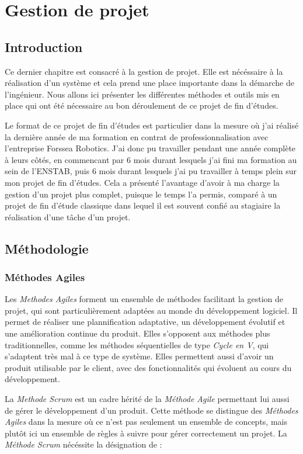 \chapter{Gestion de projet}
	
	\section{Introduction}

		Ce dernier chapitre est consacré à la gestion de projet. Elle est nécéssaire à la réalisation d'un système et cela prend une place importante dans la démarche de l'ingénieur. Nous allons ici présenter les différentes méthodes et outils mis en place qui ont été nécessaire au bon déroulement de ce projet de fin d'études.

		Le format de ce projet de fin d'études est particulier dans la mesure où j'ai réalisé la dernière année de ma formation en contrat de professionnalisation avec l'entreprise Forssea Robotics. J'ai donc pu travailler pendant une année complète à leurs côtés, en commencant par 6 mois durant lesquels j'ai fini ma formation au sein de l'\gls{ENSTAB}, puis 6 mois durant lesquels j'ai pu travailler à temps plein sur mon projet de fin d'études. Cela a présenté l'avantage d'avoir à ma charge la gestion d'un projet plus complet, puisque le temps l'a permis, comparé à un projet de fin d'étude classique dans lequel il est souvent confié au stagiaire la réalisation d'une tâche d'un projet.

	\section{Méthodologie}

		\subsection{Méthodes Agiles}
			Les \textit{Methodes Agiles} forment un ensemble de méthodes facilitant la gestion de projet, qui sont particulièrement adaptées au monde du développement logiciel. Il permet de réaliser une plannification adaptative, un développement évolutif et une amélioration continue du produit. Elles s'opposent aux méthodes plus traditionnelles, comme les méthodes séquentielles de type \textit{Cycle en V}, qui s'adaptent très mal à ce type de système. Elles permettent aussi d'avoir un produit utilisable par le client, avec des fonctionnalités qui évoluent au cours du développement.

			La \textit{Methode Scrum} est un cadre hérité de la \textit{Méthode Agile} permettant lui aussi de gérer le développement d'un produit. Cette méthode se distingue des \textit{Méthodes Agiles} dans la mesure où ce n'est pas seulement un ensemble de concepts, mais plutôt ici un ensemble de règles à suivre pour gérer correctement un projet. La \textit{Méthode Scrum} nécéssite la désignation de :


